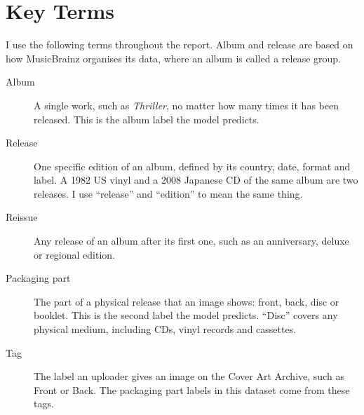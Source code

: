 \documentclass[11pt,a4paper]{article}
\begin{document}
\clearpage\appendix
\section{Key Terms}\label{app:terms}
I use the following terms throughout the report. Album and release are based on how MusicBrainz organises its data, where an album is called a release group.
\begin{description}
\item[Album] A single work, such as \textit{Thriller}, no matter how many times it has been released. This is the album label the model predicts.
\item[Release] One specific edition of an album, defined by its country, date, format and label. A 1982 US vinyl and a 2008 Japanese CD of the same album are two releases. I use ``release'' and ``edition'' to mean the same thing.
\item[Reissue] Any release of an album after its first one, such as an anniversary, deluxe or regional edition.
\item[Packaging part] The part of a physical release that an image shows: front, back, disc or booklet. This is the second label the model predicts. ``Disc'' covers any physical medium, including CDs, vinyl records and cassettes.
\item[Tag] The label an uploader gives an image on the Cover Art Archive, such as Front or Back. The packaging part labels in this dataset come from these tags.
\end{description}
\end{document}
